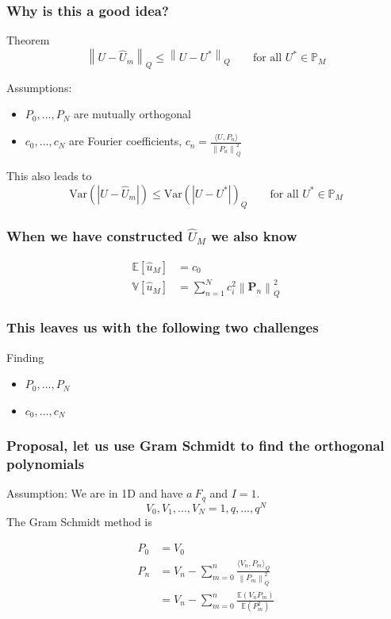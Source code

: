 \documentclass[handout]{beamer}
\newcommand{\p}{\boldsymbol{P}}
\newcommand{\norm}[1]{\left\lVert#1\right\rVert}
\begin{document}
\begin{frame}
\frametitle{Why is this a good idea?}
\begin{block}{Theorem}
  \[\norm{U-\hat{U}_m}_Q \leq \norm{U-U^*}_Q \qquad \text{for all } U^* \in \mathbb{P}_M\]
\end{block}
Assumptions: 
\begin{itemize}
  \item $P_0,...,P_N$ are mutually orthogonal
  \item $c_0,...,c_N$ are Fourier coefficients, $c_n = \frac{\langle U, P_n\rangle}{\norm{P_n}^2_Q}$
 \end{itemize}
 This also leads to 
  \[\text{Var}(|U-\hat{U}_m|)\leq \text{Var}(|U-U^*|)_Q \qquad \text{for all } U^* \in \mathbb{P}_M\]
\end{frame}

\begin{frame}
 \frametitle{When we have constructed $\hat U_M$ we also know}
   \begin{align*}
  \mathbb E[\hat u_M] &= c_0\\
  \mathbb V[\hat u_M] &= \sum_{n=1}^N c_i^2\norm{\p_n}_{Q}^2
  \end{align*}
\end{frame}

\begin{frame}
 \frametitle{This leaves us with the following two challenges}
 
 Finding
 \begin{itemize}
  \item $P_0,...,P_N$
  \item $c_0,...,c_N$
 \end{itemize}

\end{frame}

\begin{frame}
 \frametitle{Proposal, let us use Gram Schmidt to find the orthogonal polynomials}
 Assumption: We are in 1D and have $a ~ F_q$ and $I = 1$. 
 \[V_0, V_1,...,V_N = 1, q,...,q^N\]
 The Gram Schmidt method is
 
 \begin{align*}
    P_0 &= V_0\\
    P_n &= V_n - \sum_{m=0}^n \frac{\langle V_n,P_m\rangle_Q}{\norm{P_m}^2_Q}\\
  &= V_n - \sum_{m=0}^n\frac{\mathbb{E}(V_nP_m)}{\mathbb{E}(P_m^2)}
 \end{align*}

\end{frame}
\end{document}
